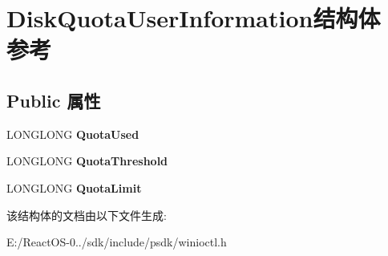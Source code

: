 \hypertarget{struct_disk_quota_user_information}{}\section{Disk\+Quota\+User\+Information结构体 参考}
\label{struct_disk_quota_user_information}
\subsection*{Public 属性}
\begin{DoxyCompactItemize}
\item 
\mbox{\label{struct_disk_quota_user_information_ab8fd5a8f822fedcf0f7c31633bd1ca45}} 
L\+O\+N\+G\+L\+O\+NG {\bfseries Quota\+Used}
\item 
\mbox{\label{struct_disk_quota_user_information_a8c98e98dad53ad33ff455a0477f69624}} 
L\+O\+N\+G\+L\+O\+NG {\bfseries Quota\+Threshold}
\item 
\mbox{\label{struct_disk_quota_user_information_ae613dd887733b7d85e96fbeb445e3dba}} 
L\+O\+N\+G\+L\+O\+NG {\bfseries Quota\+Limit}
\end{DoxyCompactItemize}


该结构体的文档由以下文件生成\+:\begin{DoxyCompactItemize}
\item 
E\+:/\+React\+O\+S-\/0../sdk/include/psdk/winioctl.\+h\end{DoxyCompactItemize}
